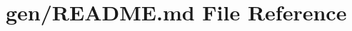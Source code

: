 \hypertarget{gen_2README_8md}{\section{gen/\-R\-E\-A\-D\-M\-E.md File Reference}
\label{gen_2README_8md}
}
